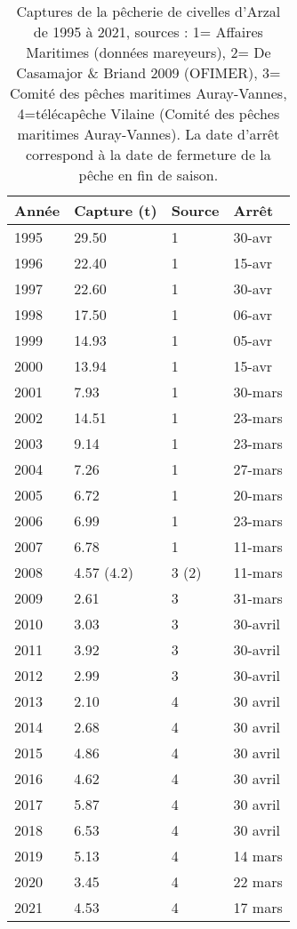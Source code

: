 \documentclass[10pt,twocolumn,titlepage,twoside]{article}\usepackage[]{graphicx}\usepackage[]{color}
\begin{document}
\begin{table}[htpb]
\centering
\caption{Captures de la pêcherie de civelles d'Arzal de 1995 à 2021, sources : 
1= Affaires Maritimes (données mareyeurs), 
2= De Casamajor \& Briand 2009 (OFIMER),
3= Comité des pêches maritimes Auray-Vannes,
4=télécapêche Vilaine (Comité des pêches maritimes Auray-Vannes). 
La date d'arrêt correspond à la date de fermeture de la pêche en fin de saison.}
\label{tableau_captures}
\begin{tabular}{llll}
\toprule
Année & Capture (t) & Source & Arrêt \\ 
\midrule
1995  & 29.50  &  1 & 30-avr \\
1996  & 22.40  &  1 & 15-avr \\
1997  & 22.60  &  1 & 30-avr \\
1998  & 17.50  &  1 & 06-avr \\
1999  & 14.93  &  1 & 05-avr \\
2000  & 13.94  &  1 & 15-avr \\
2001  & 7.93   &  1 & 30-mars \\
2002  & 14.51  &  1 & 23-mars \\
2003  & 9.14 &  1   & 23-mars \\
2004  & 7.26 &  1  & 27-mars \\
2005  & 6.72 &  1  & 20-mars \\
2006  & 6.99 &  1  & 23-mars \\
2007  & 6.78 &  1  & 11-mars \\
2008  & 4.57 (4.2) & 3 (2) & 11-mars\\
2009  & 2.61 & 3  & 31-mars \\
2010  & 3.03 & 3 & 30-avril \\
2011  & 3.92 & 3  & 30-avril \\
2012  & 2.99 & 3  & 30-avril \\
2013  & 2.10 & 4  & 30 avril \\
2014  & 2.68 & 4  & 30 avril \\
2015  & 4.86 & 4  & 30 avril \\
2016  & 4.62 & 4 &  30 avril\\  %
2017  & 5.87 & 4  & 30 avril \\ 
2018 & 6.53 &  4  & 30 avril \\ 
2019 & 5.13 &  4  &  14 mars\\ 
2020 & 3.45 &  4  &  22 mars \\ 
2021 & 4.53 &  4  &  17 mars \\
\bottomrule
\end{tabular}
\end{table}
\normalsize
\end{document}
